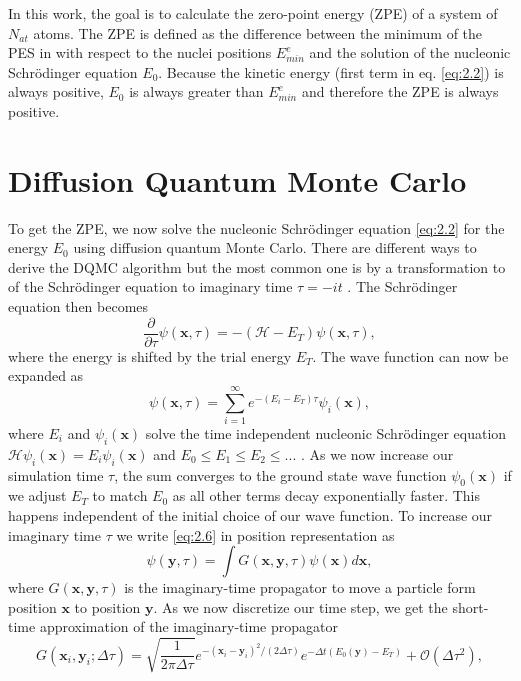\documentclass [12pt]{report}
\begin{document}
In this work, the goal is to calculate the zero-point energy (ZPE) of a system of $N_{at}$ atoms. The ZPE is defined as the difference between the minimum of the PES in with respect to the nuclei positions $E_{min}^e$ and the solution of the nucleonic Schrödinger equation $E_0$. Because the kinetic energy (first term in eq. \eqref{eq:2.2}) is always positive, $E_0$ is always greater than $E_{min}^e$ and therefore the ZPE is always positive.

\section{Diffusion Quantum Monte Carlo}
To get the ZPE, we now solve the nucleonic Schrödinger equation \eqref{eq:2.2} for the energy $E_0$ using diffusion quantum Monte Carlo. There are different ways to derive the DQMC algorithm but the most common one is by a transformation to of the Schrödinger equation to imaginary time $\tau = -it$ \cite{mccoy,cyrus,herleitung2}. The Schrödinger equation then becomes
\begin{equation} \label{eq:2.5}
\frac{\partial}{\partial \tau} \psi(\bm{x},\tau) = -(\mathcal{H} - E_T) \psi(\bm{x},\tau),
\end{equation}
where the energy is shifted by the trial energy $E_T$. The wave function can now be expanded as
\begin{equation} \label{eq:2.6}
\psi(\bm{x},\tau) = \sum_{i=1}^{\infty} e^{-(E_i - E_T)\tau}\psi_i(\bm{x}),
\end{equation}
where $E_i$ and $\psi_i(\bm{x})$ solve the time independent nucleonic Schrödinger equation $\mathcal{H}\psi_i(\bm{x}) = E_i \psi_i(\bm{x})$ and $E_0 \leq E_1 \leq E_2 \leq...$ .
As we now increase our simulation time $\tau$, the sum converges to the ground state wave function $\psi_0(\bm{x})$ if we adjust $E_T$ to match $E_0$ as all other terms decay exponentially faster. This happens independent of the initial choice of our wave function.
To increase our imaginary time $\tau$ we write \eqref{eq:2.6} in position representation as
\begin{equation} \label{propagate}
\psi(\bm{y},\tau) = \int G(\bm{x},\bm{y},\tau) \psi(\bm{x}) d \bm{x},
\end{equation}
where $G(\bm{x},\bm{y},\tau)$ is the imaginary-time propagator to move a particle form position $\bm{x}$ to position $\bm{y}$. 
As we now discretize our time step, we get the short-time approximation of the imaginary-time  propagator 
\begin{equation} \label{eq:2.7}
G(\bm{x}_i,\bm{y}_i;\Delta \tau) = \sqrt{\frac{1}{2 \pi \Delta \tau}} e^{-(\bm{x}_i-\bm{y}_i)^2 /(2 \Delta \tau)} e^{-\Delta t (E_0(\bm{y}) - E_T)} + \mathcal{O}(\Delta \tau^2),
\end{equation}
\end{document}
